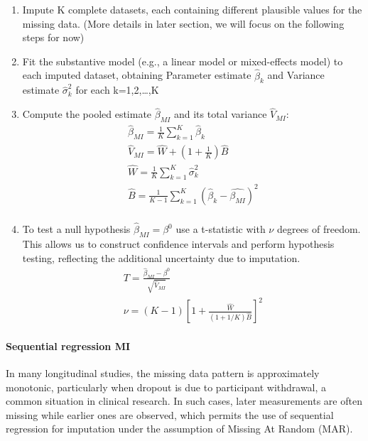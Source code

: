 \documentclass{article}
\begin{document}
\begin{enumerate}
\def\labelenumi{\arabic{enumi}.}
\item
  Impute K complete datasets, each containing different plausible values
  for the missing data. (More details in later section, we will focus on
  the following steps for now)
\item
  Fit the substantive model (e.g., a linear model or mixed-effects
  model) to each imputed dataset, obtaining Parameter estimate
  \(\hat{\beta}_{k}\) and Variance estimate \(\hat{\sigma}_{k}^{2}\) for
  each k=1,2,\ldots,K
\item
  Compute the pooled estimate \(\hat{\beta}_{MI}\) and its total
  variance \(\hat{V}_{MI}\): \begin{align*}
    \hat{\beta}_{MI} = \frac{1}{K} \sum_{k=1}^{K}{\hat{\beta}_{k}} \\
    \hat{V}_{MI} = \hat{W} + (1 + \frac{1}{K}) \hat{B} \\
    \hat{W} = \frac{1}{K} \sum^{K}_{k=1}{\hat{\sigma}^{2}_{k}} \\
    \hat{B} = \frac{1}{K-1} \sum^{K}_{k=1}({\hat{\beta}_{k}} - \hat{\beta_{MI}})^{2} \\
    \end{align*}
\item
  To test a null hypothesis \(\hat{\beta}_{MI} = \beta^{0}\) use a
  t-statistic with \(\nu\) degrees of freedom. This allows us to
  construct confidence intervals and perform hypothesis testing,
  reflecting the additional uncertainty due to imputation.
  \begin{align*}
    T = \frac{\hat{\beta}_{MI} - \beta^{0}}  {\sqrt{\hat{V}_{MI}}} \\
    \nu = (K-1)[1 + \frac{\hat{W}}{(1 + 1/K) \hat{B}}]^{2}
    \end{align*}
\end{enumerate}

\paragraph{Sequential regression MI}\label{sequential-regression-mi}

In many longitudinal studies, the missing data pattern is approximately
monotonic, particularly when dropout is due to participant withdrawal, a
common situation in clinical research. In such cases, later measurements
are often missing while earlier ones are observed, which permits the use
of sequential regression for imputation under the assumption of Missing
At Random (MAR).
\end{document}
